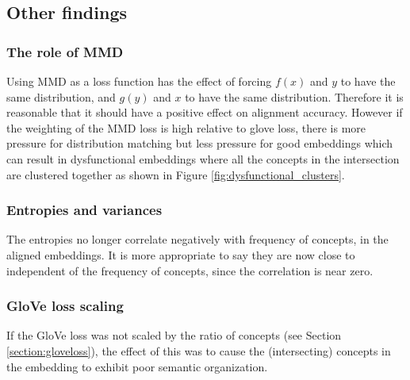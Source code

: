 \subsection{Other findings}
\subsubsection{The role of MMD}

Using MMD as a loss function has the effect of forcing $f(x)$ and $y$ to have the same distribution, and  $g(y)$ and $x$ to have the same distribution. Therefore it is reasonable that it should have a positive effect on alignment accuracy. However if the weighting of the MMD loss is high relative to glove loss, there is more pressure for distribution  matching but less pressure for good embeddings which can result in dysfunctional embeddings where all the concepts in the intersection are clustered together as shown in Figure \ref{fig:dysfunctional_clusters}. 

\subsubsection{Entropies and variances}

The entropies no longer correlate negatively with frequency of concepts, in the aligned embeddings. It is more appropriate to say they are now close to independent of the frequency of concepts, since the correlation is near zero. 

\subsubsection{GloVe loss scaling}
If the GloVe loss was not scaled by the ratio of concepts (see Section \ref{section:gloveloss}), the effect of this was to cause the (intersecting) concepts in the embedding to exhibit poor semantic organization.




